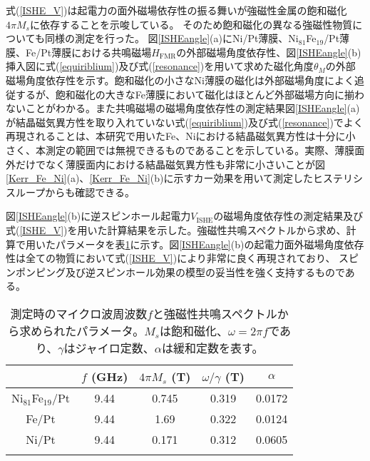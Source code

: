 式(\ref{ISHE_V})は起電力の面外磁場依存性の振る舞いが強磁性金属の飽和磁化$4\pi M_s$に依存することを示唆している。%
そのため飽和磁化の異なる強磁性物質についても同様の測定を行った。
図\ref{ISHEangle}(a)にNi/Pt薄膜、Ni$_{81}$Fe$_{19}$/Pt薄膜、Fe/Pt薄膜における共鳴磁場$H_\text{FMR}$の外部磁場角度依存性、図\ref{ISHEangle}(b)挿入図に式(\ref{equiriblium})及び式(\ref{resonance})を用いて求めた磁化角度$\theta_M$の外部磁場角度依存性を示す。飽和磁化の小さなNi薄膜の磁化は外部磁場角度によく追従するが、飽和磁化の大きなFe薄膜において磁化はほとんど外部磁場方向に揃わないことがわかる。また共鳴磁場の磁場角度依存性の測定結果図\ref{ISHEangle}(a)が結晶磁気異方性を取り入れていない式(\ref{equiriblium})及び式(\ref{resonance})でよく再現されることは、本研究で用いたFe、Niにおける結晶磁気異方性は十分に小さく、本測定の範囲では無視できるものであることを示している。実際、薄膜面外だけでなく薄膜面内における結晶磁気異方性も非常に小さいことが図\ref{Kerr_Fe_Ni}(a)、\ref{Kerr_Fe_Ni}(b)に示すカー効果を用いて測定したヒステリシスループからも確認できる。

図\ref{ISHEangle}(b)に逆スピンホール起電力$V_\text{ISHE}$の磁場角度依存性の測定結果及び式(\ref{ISHE_V})を用いた計算結果を示した。強磁性共鳴スペクトルから求め、計算で用いたパラメータを表\ref{tablepara}に示す。図\ref{ISHEangle}(b)の起電力面外磁場角度依存性は全ての物質において式(\ref{ISHE_V})により非常に良く再現されており、
スピンポンピング及び逆スピンホール効果の模型の妥当性を強く支持するものである。

\begin{table}
\begin{center}
\caption{測定時のマイクロ波周波数$f$と強磁性共鳴スペクトルから求められたパラメータ。$M_s$は飽和磁化、$\omega=2\pi f$であり、$\gamma$はジャイロ定数、$\alpha$は緩和定数を表す。}
\begin{tabular}{ccccc}
\hline\hline
&$f$ (GHz)&$4\pi M_s$ (T)&$\omega/\gamma$ (T)&$\alpha$\\
\hline
Ni$_{81}$Fe$_{19}$/Pt&9.44&0.745&0.319&0.0172 \\
Fe/Pt&9.44&1.69&0.322&0.0124\\
Ni/Pt&9.44&0.171&0.312&0.0605\\
\hline\hline
\label{tablepara} 
\end{tabular}
\end{center}
\end{table}



